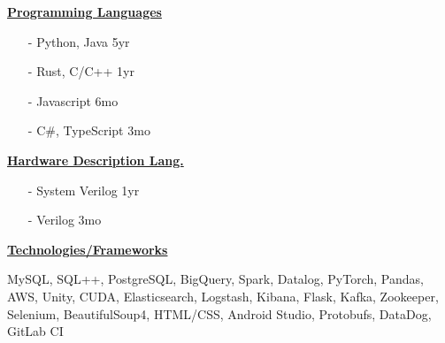 \documentclass{WeiAndrew}
\begin{document}
\setlength{\topskip}{0pt}
\noindent{}%
{%
    \hspace{0.02\textwidth}
    \begin{minipage}[t][\textheight-2\fboxsep-2\fboxrule][t]{0.25\textwidth}
        \color{white}
        \vspace{12px}
        \vspace{12px}
        \vspace{12px}

        \begin{itemize}[align=center, leftmargin=7.5mm]
        \end{itemize}
        \vspace{12px}

        \textbf{\underline{Programming Languages}}
        \begin{itemize}[leftmargin=4mm, rightmargin=20px]
            \item[-] Python, Java    \hfill 5yr
            \item[-] Rust, C/C++     \hfill 1yr
            \item[-] Javascript      \hfill 6mo
            \item[-] C\#, TypeScript \hfill 3mo
        \end{itemize}
        \vspace{12px}

        \noindent\textbf{\underline{Hardware Description Lang.}}
        \begin{itemize}[leftmargin=4mm, rightmargin=20px]
            \item[-] System Verilog \hfill 1yr
            \item[-] Verilog        \hfill 3mo
        \end{itemize}
        \vspace{12px}

        \textbf{\underline{Technologies/Frameworks}}
        \raggedright MySQL, SQL++, PostgreSQL, BigQuery,
        Spark, Datalog, PyTorch,
        Pandas, AWS, Unity, CUDA,
        Elasticsearch, Logstash,
        Kibana, Flask, Kafka,
        Zookeeper, Selenium,
        BeautifulSoup4, HTML/CSS,
        Android Studio, Protobufs,
        DataDog, GitLab CI
        \vspace{12px}


\end{minipage}}
\end{document}
